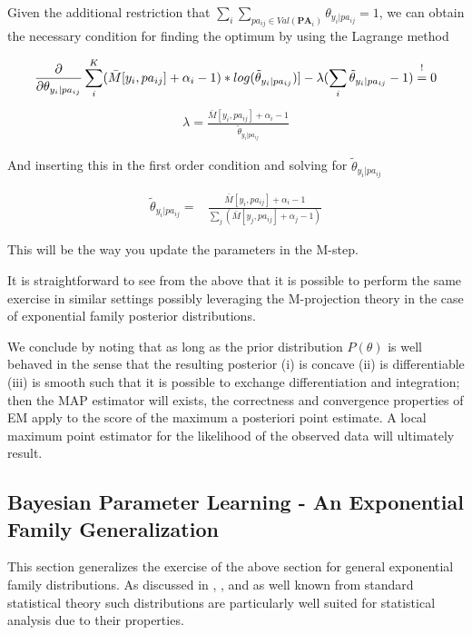\documentclass[11pt]{article}
\begin{document}
\begin{article}
Given the additional restriction that \(\sum_i \sum_{pa_{ij} \in
   Val(\textbf{PA}_i)} \theta_{y_i | pa_{ij}} = 1\), we can obtain the necessary
condition for finding the optimum by using the Lagrange method

\begin{align} \label{eq:first-order1}
\frac{\partial}{\partial \theta_{y_i | pa_{ij}}} \sum_i^K (\bar{M}[y_i, pa_{ij}] + \alpha_i - 1) * log(\tilde{\theta}_{y_i | pa_{ij}})] - \lambda (\sum_i \tilde{\theta}_{y_i | pa_{ij}} - 1) \mathrel{\stackon[5pt]{$=$}{$\scriptstyle!$}} 0
\end{align}
\begin{align} \label{eq:first-order2}
\lambda = \frac{\bar{M}[y_i, pa_{ij}] + \alpha_i - 1}{\tilde{\theta}_{y_i | pa_{ij}}}
\end{align}

And inserting this in the first order condition and solving for
\(\tilde{\theta}_{y_i | pa_{ij}}\)

\begin{align} \label{eq:solution}
\tilde{\theta}_{y_i | pa_{ij}} =& \frac{\bar{M}[y_i, pa_{ij}] + \alpha_i - 1}{\sum_j (\bar{M}[y_j, pa_{ij}] + \alpha_j - 1)}
\end{align}

This will be the way you update the parameters in the M-step.

It is straightforward to see from the above that it is possible to
perform the same exercise in similar settings possibly leveraging
the M-projection theory in the case of exponential family posterior
distributions. 

We conclude by noting that as long as the prior distribution
\(P(\theta)\) is well behaved in the sense that the resulting
posterior (i) is concave (ii) is differentiable (iii) is smooth
such that it is possible to exchange differentiation and
integration; then the MAP estimator will exists, the correctness
and convergence properties of EM apply to the score of the maximum
a posteriori point estimate. A local maximum point estimator for
the likelihood of the observed data will ultimately result.

\subsection{Bayesian Parameter Learning - An Exponential Family Generalization}
\label{sec:org26a2a09}

This section generalizes the exercise of the above section for
general exponential family distributions. As discussed in
\cite{barndorff1978hyperbolic}, \cite{geiger1998asymptotic},
\cite{lauritzen1996graphical} and as well known from standard
statistical theory such distributions are particularly well suited
for statistical analysis due to their properties. 


\end{article}
\end{document}
